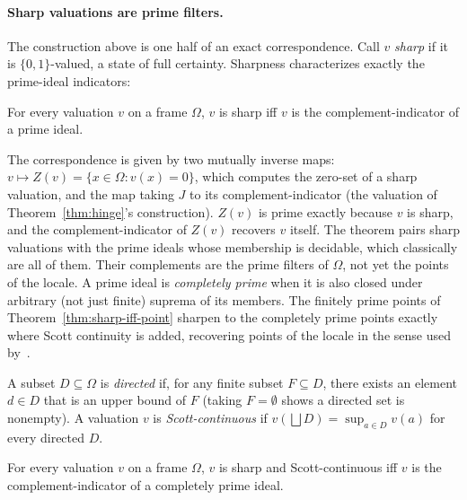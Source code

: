 \paragraph{Sharp valuations are prime filters.}
The construction above is one half of an exact
correspondence.  Call $v$ \emph{sharp} if it is $\{0,1\}$-valued, a
state of full certainty.  Sharpness characterizes exactly the
prime-ideal indicators:

\begin{theorem}
\label{thm:sharp-iff-point}
For every valuation $v$ on a frame $\Omega$, $v$ is sharp iff $v$ is
the complement-indicator of a prime ideal.
\end{theorem}

\noindent
The correspondence is given by two mutually inverse maps: $v \mapsto Z(v) =
\{x \in \Omega : v(x) = 0\}$, which computes the zero-set of a sharp valuation, 
and the map taking
$J$ to its complement-indicator (the valuation of
Theorem~\ref{thm:hinge}'s construction).  $Z(v)$ is prime exactly
because $v$ is sharp, and the complement-indicator of $Z(v)$
recovers $v$ itself.  The theorem pairs sharp valuations with the prime
ideals whose membership is decidable, which classically are all of them.
Their complements are the prime filters of $\Omega$, not yet the points
of the locale.  A prime ideal is
\emph{completely prime} when it is also closed under arbitrary
(not just finite) suprema of its members. 
The finitely prime points 
of Theorem~\ref{thm:sharp-iff-point} sharpen to
the completely prime points exactly where Scott continuity is added,
recovering points of the locale in the sense used
by~\cite{vickers2008,coquand-spitters2009}.

\begin{definition}
A subset $D \subseteq \Omega$ is \emph{directed} if, for any finite
subset $F \subseteq D$, there exists an element $d \in D$ that is an
upper bound of $F$ (taking $F = \emptyset$ shows a directed set is
nonempty).  A
valuation $v$ is \emph{Scott-continuous} if
$v(\bigsqcup D) = \sup_{a \in D} v(a)$ for every directed $D$.
\end{definition}

\begin{theorem}
For every valuation $v$ on a frame $\Omega$, $v$ is sharp and
Scott-continuous iff $v$ is the complement-indicator of a completely
prime ideal.
\end{theorem}

